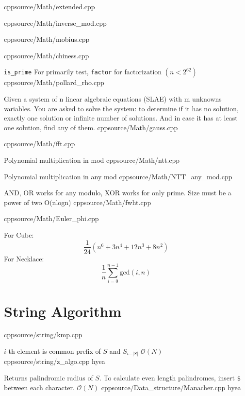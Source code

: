 \documentclass[landscape, 8pt, a4paper, oneside]{extarticle}
\begin{document}
\begin{multicols}{3}
{}
{}
{cpp}{source/Math/extended.cpp}

{}
{}
{cpp}{source/Math/inverse_mod.cpp}

{} {}
{cpp}{source/Math/mobius.cpp}

{} {}
{cpp}{source/Math/chiness.cpp}

{\texttt{is\_prime} For primarily test, \texttt{factor} for factorization $(n < 2^{62})$}
{}
{cpp}{source/Math/pollard_rho.cpp}

{Given a system of n linear algebraic equations (SLAE) with
m unknowns variables. You are asked to solve the system: to determine if it has no solution, exactly one solution or infinite number of solutions. And in case it has at least one solution, find any of them.}
{}
{cpp}{source/Math/gauss.cpp}

{}
{}
{cpp}{source/Math/fft.cpp}

{Polynomial multiplication in mod}
{}
{cpp}{source/Math/ntt.cpp}

{Polynomial multiplication in any mod}
{}
{cpp}{source/Math/NTT_any_mod.cpp}

{AND, OR works for any modulo, XOR works for only prime. Size must be a power of two}
{O(nlogn)}
{cpp}{source/Math/fwht.cpp}

{}
{}
{cpp}{source/Math/Euler_phi.cpp}

{ For Cube: \[\frac{1}{24}(n^6 + 3n^4 + 12n^3 + 8n^2)\] For Necklace: \[ \frac{1}{n} \sum_{i=0}^{n-1} \text{gcd}(i, n) \]}
{}
{}{}

\section{String Algorithm}



{}
{}
{cpp}{source/string/kmp.cpp}

{$i$-th element is common prefix of $S$ and $S_{i \dots \lvert S \rvert}$}
{$\mathcal{O}(N)$}
{cpp}{source/string/z_algo.cpp}
{hyea}

{Returns palindromic radius of $S$. To calculate even length palindromes, insert \texttt{\$} between each character.}
{$\mathcal{O}(N)$}
{cpp}{source/Data_structure/Manacher.cpp}
{hyea}


\end{multicols}
\end{document}
